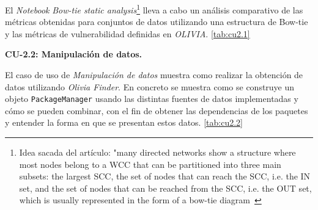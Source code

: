 El \textit{Notebook} \textit{Bow-tie static analysis}\footnote{Idea sacada del artículo:
	"many directed networks show a structure where most nodes belong to a WCC that can be
	partitioned into three main subsets: the largest SCC, the set of nodes that can reach the
	SCC, i.e. the IN set, and the set of nodes that can be reached from the SCC, i.e. the OUT
	set, which is usually represented in the form of a bow-tie diagram~\cite{Broder2000309}} lleva a cabo un análisis comparativo de las
métricas obtenidas para conjuntos de datos utilizando una estructura de Bow-tie\cite{enwiki:1148363387} y
las métricas de vulnerabilidad definidas en \textit{OLIVIA}. \ref{tab:cu2.1}


\textbf{CU-2.2: Manipulación de datos.}

El caso de uso de \textit{Manipulación de datos} muestra como realizar la obtención de datos utilizando \textit{Olivia Finder}.
En concreto se muestra como se construye un objeto \texttt{PackageManager} usando las distintas fuentes de datos implementadas y cómo se pueden combinar, con el fin de obtener las dependencias
de los paquetes y entender la forma en que se presentan estos datos. \ref{tab:cu2.2}

